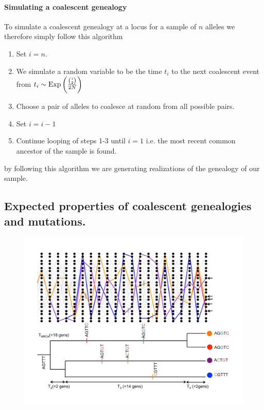 \paragraph{Simulating a coalescent genealogy}
To simulate a coalescent genealogy at a locus for a sample of $n$ alleles we therefore simply follow this
algorithm
\begin{enumerate}
\item Set $i=n$.
\item We simulate a random variable to be the time $t_i$ to the next coalescent event from $t_i \sim
  \text{Exp}\left(\nicefrac{{i \choose
 2}}{2N} \right)$
\item Choose a pair of alleles to coalesce at random from all possible
 pairs.
\item Set $i=i-1$
\item Continue looping of steps 1-3 until $i=1$ i.e. the most recent
 common ancestor of the sample is found.
\end{enumerate}
by following this algorithm we are generating realizations of the
genealogy of our sample. \\



\subsection{Expected properties of coalescent genealogies and
  mutations.} 

\begin{figure}
\begin{center}
\includegraphics[width= \textwidth]{figures/Coalescent/Coal_w_muts.pdf}
\end{center}
\caption{ } \label{fig:Coal_w_muts}
\end{figure}



